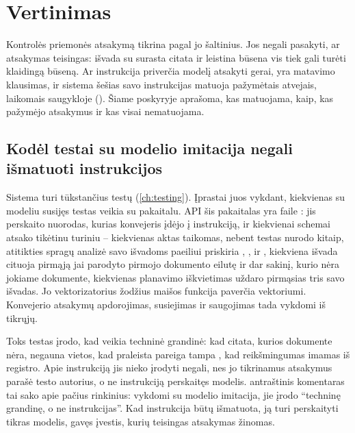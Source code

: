 \section{Vertinimas}\label{sec:control:eval}

Kontrolės priemonės atsakymą tikrina pagal jo šaltinius. Jos negali pasakyti, ar atsakymas
teisingas: išvada su surasta citata ir leistina būsena vis tiek gali turėti klaidingą būseną.
Ar instrukcija priverčia modelį atsakyti gerai, yra matavimo klausimas, ir sistema šešias
savo instrukcijas matuoja pažymėtais atvejais, laikomais saugykloje ().
Šiame poskyryje aprašoma, kas matuojama, kaip, kas pažymėjo atsakymus ir kas visai
nematuojama.

\subsection{Kodėl testai su modelio imitacija negali išmatuoti instrukcijos}

Sistema turi tūkstančius testų (\cref{ch:testing}). Įprastai juos vykdant, kiekvienas su
modeliu susijęs testas veikia su pakaitalu. API šis pakaitalas yra  faile
: jis perskaito nuorodas, kurias konvejeris įdėjo į instrukciją, ir
kiekvienai schemai atsako tikėtinu turiniu -- kiekvienas aktas taikomas, nebent testas
nurodo kitaip, atitikties spragų analizė savo išvadoms paeiliui priskiria ,
,  ir , kiekviena išvada cituoja pirmąją jai parodyto
pirmojo dokumento eilutę ir dar sakinį, kurio nėra jokiame dokumente, kiekvienas planavimo
iškvietimas uždaro pirmąsias tris savo išvadas. Jo vektorizatorius žodžius maišos funkcija
paverčia vektoriumi. Konvejerio atsakymų apdorojimas, susiejimas ir saugojimas tada vykdomi
iš tikrųjų.

Toks testas įrodo, kad veikia techninė grandinė: kad citata, kurios dokumente nėra,
negauna vietos, kad praleista pareiga tampa , kad reikšmingumas
imamas iš registro. Apie instrukciją jis nieko įrodyti negali, nes jo tikrinamus atsakymus
parašė testo autorius, o ne instrukciją perskaitęs modelis. 
antraštinis komentaras tai sako apie pačius rinkinius: vykdomi su modelio imitacija, jie
įrodo \enquote{techninę grandinę, o ne instrukcijas}. Kad instrukcija būtų išmatuota, ją turi
perskaityti tikras modelis, gavęs įvestis, kurių teisingas atsakymas žinomas.

